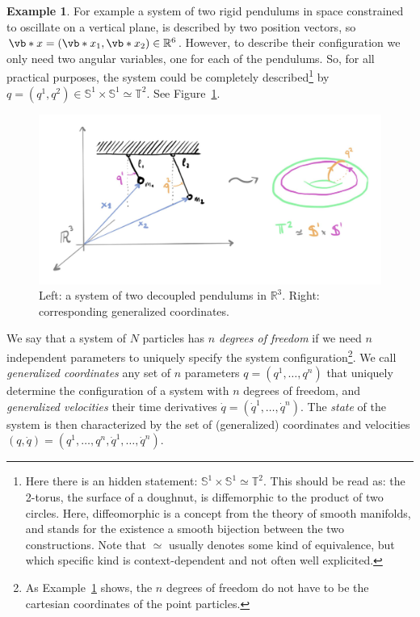 \documentclass[english,fontsize=11pt,paper=b5]{scrbook}
\theoremstyle{definition}
\newtheorem{example}{Example}[chapter]
\begin{document}
  \begin{example}\label{example:gcoords}
    For example a system of two rigid pendulums in space constrained to oscillate on a vertical plane, is described by two position vectors, so $\vb*{x} = (\vb*{x}_1, \vb*{x}_2)\in\mathbb{R}^{6}$.
    However, to describe their configuration we only need two angular variables, one for each of the pendulums. So, for all practical purposes, the system could be completely described\footnote{Here there is an hidden statement: $\mathbb{S}^1\times\mathbb{S}^1 \simeq \mathbb{T}^2$. This should be read as: the 2-torus, the surface of a doughnut, is diffemorphic to the product of two circles. Here, diffeomorphic is a concept from the theory of smooth manifolds, and stands for the existence a smooth bijection between the two constructions. Note that $\simeq$ usually denotes some kind of equivalence, but which specific kind is context-dependent and not often well explicited.} by $q = (q^1, q^2) \in \mathbb{S}^1\times\mathbb{S}^1 \simeq \mathbb{T}^2$. See Figure~\ref{fig:twopend}.
  \end{example}

  \begin{figure}[ht!]
    \centering
    \includegraphics[width=0.9\linewidth,trim={0 1cm 0 1cm}, clip]{images/HM-1-1.pdf}
    \caption{Left: a system of two decoupled pendulums in $\mathbb{R}^3$. Right: corresponding generalized coordinates.}%
    \label{fig:twopend}
  \end{figure}

  We say that a system of $N$ particles has \emph{$n$ degrees of freedom} if we need $n$ independent parameters to uniquely specify the system configuration\footnote{As Example~\ref{example:gcoords} shows, the $n$ degrees of freedom do not have to be the cartesian coordinates of the point particles.}. We call \emph{generalized coordinates} any set of $n$ parameters $q = (q^1, \ldots, q^n)$ that uniquely determine the configuration of a system with $n$ degrees of freedom, and \emph{generalized velocities} their time derivatives $\dot q = (\dot q^1, \ldots, \dot q^n)$. The \emph{state} of the system is then characterized by the set of (generalized) coordinates and velocities $(q, \dot q) = \left(q^1, \ldots, q^n,\dot q^1, \ldots, \dot q^n\right)$.
\end{document}

